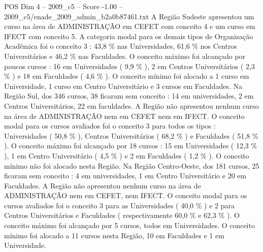 \begin{textsample}{POS Dim 4 – 2009\_c5 – Score -1.00 – 2009\_c5/enade\_2009\_admin\_b2a0b87461.txt}
A Região Sudeste apresentou um curso na área de ADMINISTRAÇÃO em CEFET com conceito 4 e um curso em IFECT com conceito 5.
A categoria modal para os demais tipos de Organização Acadêmica foi o conceito 3 : 43,8 \% nas Universidades, 61,6 \% nos Centros Universitários e 46,2 \% nas Faculdades.
O conceito máximo foi alcançado por poucos cursos : 16 em Universidades ( 9,9 \% ), 2 em Centros Universitários ( 2,3 \% ) e 18 em Faculdades ( 4,6 \% ).
O conceito mínimo foi alocado a 1 curso em Universidade, 1 curso em Centro Universitário e 3 cursos em Faculdades.
Na Região Sul, dos 346 cursos, 38 ficaram sem conceito : 14 em universidades, 2 em Centros Universitários, 22 em faculdades.
A Região não apresentou nenhum curso na área de ADMINISTRAÇÃO nem em CEFET nem em IFECT.
O conceito modal para os cursos avaliados foi o conceito 3 para todos os tipos : Universidades ( 50,8 \% ), Centros Universitários ( 68,2 \% ) e Faculdades ( 51,8 \% ).
O conceito máximo foi alcançado por 18 cursos : 15 em Universidades ( 12,3 \% ), 1 em Centro Universitário ( 4,5 \% ) e 2 em Faculdades ( 1,2 \% ).
O conceito mínimo não foi alocado nesta Região.
Na Região Centro-Oeste, dos 181 cursos, 25 ficaram sem conceito : 4 em universidades, 1 em Centro Universitário e 20 em Faculdades.
A Região não apresentou nenhum curso na área de ADMINISTRAÇÃO nem em CEFET, nem IFECT.
O conceito modal para os cursos avaliados foi o conceito 3 para as Universidades ( 40,0 \% ) e 2 para Centros Universitários e Faculdades ( respectivamente 60,0 \% e 62,3 \% ).
O conceito máximo foi alcançado por 5 cursos, todos em Universidades.
O conceito mínimo foi alocado a 11 cursos nesta Região, 10 em Faculdades e 1 em Universidade.

\end{textsample}
